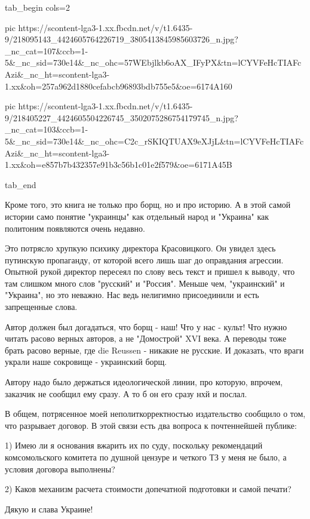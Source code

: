 \ifcmt
  tab_begin cols=2

     pic https://scontent-lga3-1.xx.fbcdn.net/v/t1.6435-9/218095143_4424605764226719_3805413845985603726_n.jpg?_nc_cat=107&ccb=1-5&_nc_sid=730e14&_nc_ohc=57WEbjlkb6oAX_IFyPX&tn=lCYVFeHcTIAFcAzi&_nc_ht=scontent-lga3-1.xx&oh=257a962d1880cefabcb96893bdb755e5&oe=6174A160

     pic https://scontent-lga3-1.xx.fbcdn.net/v/t1.6435-9/218405227_4424605504226745_3502075286754179745_n.jpg?_nc_cat=103&ccb=1-5&_nc_sid=730e14&_nc_ohc=C2c_rSKIQTUAX9eXJjL&tn=lCYVFeHcTIAFcAzi&_nc_ht=scontent-lga3-1.xx&oh=e857b7b432357e91b3c56b1c01e2f579&oe=6171A45B

  tab_end
\fi

Кроме того, это книга не только про борщ, но и про историю. А в этой самой
истории само понятие "украинцы" как отдельный народ и "Украина" как политоним
появляются очень недавно. 

Это потрясло хрупкую психику директора Красовицкого. Он увидел здесь путинскую
пропаганду, от которой всего лишь шаг до оправдания агрессии. Опытной рукой
директор пересеял по слову весь текст и пришел к выводу, что там слишком много
слов "русский" и "Россия". Меньше чем, "украинский" и "Украина", но это
неважно. Нас ведь нелигимно присоединили и есть запрещенные слова.

Автор должен был догадаться, что борщ - наш! Что у нас - культ! Что нужно
читать расово верных авторов, а не "Домострой" XVI века. А переводы тоже брать
расово верные, где die Reussen - никакие не русские. И доказать, что враги
украли наше сокровище - украинский борщ.

Автору надо было держаться идеологической линии, про которую, впрочем, заказчик
не сообщил ему сразу. А то б он его сразу нхй и послал. 

В общем, потрясенное моей неполиткорректностью издательство сообщило о том, что
разрывает договор. В этой связи есть два вопроса к почтеннейшей публике: 

1) Имею ли я основания вжарить их по суду, поскольку рекомендаций
комсомольского комитета по душной цензуре и четкого ТЗ у меня не было, а
условия договора выполнены?

2) Каков механизм расчета стоимости допечатной подготовки и самой печати? 

Дякую и слава Украине!

